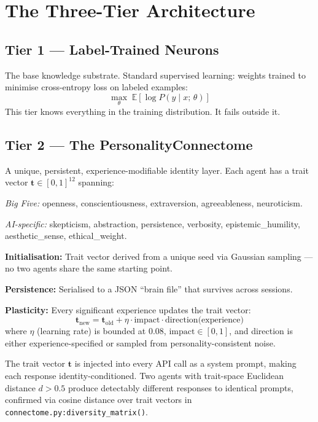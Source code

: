 \documentclass[11pt,a4paper]{article}
\begin{document}
\section{The Three-Tier Architecture}

\subsection{Tier 1 — Label-Trained Neurons}

The base knowledge substrate. Standard supervised learning: weights trained to minimise
cross-entropy loss on labeled examples:
\[
  \max_{\theta} \; \mathbb{E}\!\left[\log P(y \mid x;\, \theta)\right]
\]
This tier knows everything in the training distribution. It fails outside it.

\subsection{Tier 2 — The PersonalityConnectome}
\label{sec:connectome}

A unique, persistent, experience-modifiable identity layer. Each agent has a trait vector
$\mathbf{t} \in [0,1]^{12}$ spanning:

\textit{Big Five:} openness, conscientiousness, extraversion, agreeableness, neuroticism.

\textit{AI-specific:} skepticism, abstraction, persistence, verbosity, epistemic\_humility,
aesthetic\_sense, ethical\_weight.

\textbf{Initialisation:} Trait vector derived from a unique seed via Gaussian sampling —
no two agents share the same starting point.

\textbf{Persistence:} Serialised to a JSON ``brain file'' that survives across sessions.

\textbf{Plasticity:} Every significant experience updates the trait vector:
\[
  \mathbf{t}_{\text{new}} = \mathbf{t}_{\text{old}} + \eta \cdot \text{impact}
  \cdot \text{direction(experience)}
\]
where $\eta$ (learning rate) is bounded at $0.08$, $\text{impact} \in [0,1]$, and
direction is either experience-specified or sampled from personality-consistent noise.

The trait vector $\mathbf{t}$ is injected into every API call as a system prompt, making
each response identity-conditioned. Two agents with trait-space Euclidean distance
$d > 0.5$ produce detectably different responses to identical prompts, confirmed via
cosine distance over trait vectors in \texttt{connectome.py:diversity\_matrix()}.
\end{document}

